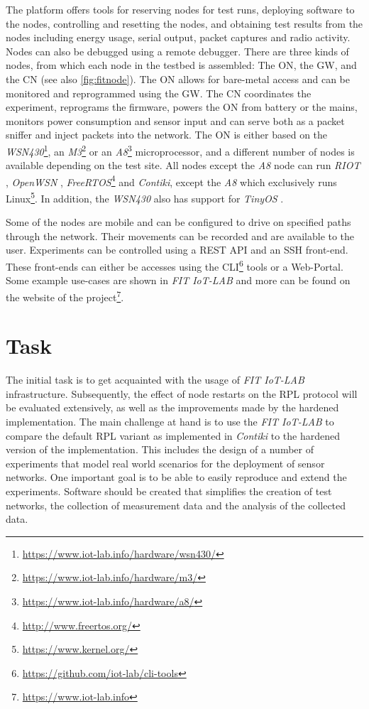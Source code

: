 \documentclass[
  a4paper,
  11pt,
  style=screen,
  extramargin,
  bcor=10mm,
  rgb,
  hyperrefdark,
  abstract=off,
  lnum,
]{tubsartcl}
\newcommand{\fitlab}{\emph{FIT IoT-LAB} }
\begin{document}
The platform offers tools for reserving nodes for test runs, deploying software to the nodes, controlling and resetting the nodes, and obtaining test results from the nodes including energy usage, serial output, packet captures and radio activity.
Nodes can also be debugged using a remote debugger.
There are three kinds of nodes, from which each node in the testbed is assembled: The \ac{ON}, the \ac{GW}, and the \ac{CN} (see also \autoref{fig:fitnode}).
The \ac{ON} allows for bare-metal access and can be monitored and reprogrammed using the \ac{GW}.
The \ac{CN} coordinates the experiment, reprograms the firmware, powers the \ac{ON} from battery or the mains, monitors power consumption and sensor input and can serve both as a packet sniffer and inject packets into the network.
The \ac{ON} is either based on the \emph{WSN430}\footnote{\url{https://www.iot-lab.info/hardware/wsn430/}}, an \emph{M3}\footnote{\url{https://www.iot-lab.info/hardware/m3/}} or an \emph{A8}\footnote{\url{https://www.iot-lab.info/hardware/a8/}} microprocessor, and a different number of nodes is available depending on the test site.
All nodes except the \emph{A8} node can run \emph{RIOT} \cite{baccelli2013riot}, \emph{OpenWSN} \cite{watteyne2012openwsn}, \emph{FreeRTOS}\footnote{\url{http://www.freertos.org/}} and \emph{Contiki}, except the \emph{A8} which exclusively runs Linux\footnote{\url{https://www.kernel.org/}}.
In addition, the \emph{WSN430} also has support for \emph{TinyOS} \cite{levis2005tinyos}.

Some of the nodes are mobile and can be configured to drive on specified paths through the network.
Their movements can be recorded and are available to the user.
Experiments can be controlled using a \ac{REST} \ac{API} and an \ac{SSH} front-end.
These front-ends can either be accesses using the \ac{CLI}\footnote{\url{https://github.com/iot-lab/cli-tools}} tools or a Web-Portal.
Some example use-cases are shown in \fitlab and more can be found on the website of the project\footnote{\url{https://www.iot-lab.info}}.

\section{Task} %

The initial task is to get acquainted with the usage of \fitlab infrastructure.
Subsequently, the effect of node restarts on the \ac{RPL} protocol will be evaluated extensively, as well as the improvements made by the hardened implementation.
The main challenge at hand is to use the \fitlab to compare the default \ac{RPL} variant as implemented in \emph{Contiki} to the hardened version of the implementation.
This includes the design of a number of experiments that model real world scenarios for the deployment of sensor networks.
One important goal is to be able to easily reproduce and extend the experiments.
Software should be created that simplifies the creation of test networks, the collection of measurement data and the analysis of the collected data.
\end{document}
